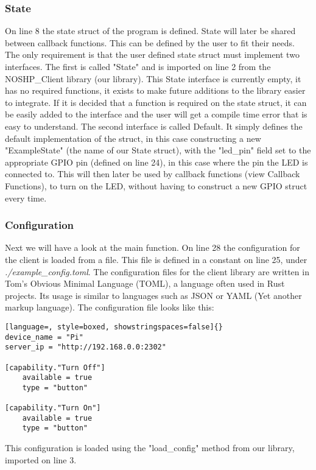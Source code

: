 \subsubsection{State}
On line 8 the state struct of the program is defined. State will later be shared between callback functions. This can be defined by the user to fit their needs. The only requirement is that the user defined state struct must implement two interfaces. The first is called "State" and is imported on line 2 from the NOSHP\_Client library (our library). This State interface is currently empty, it has no required functions, it exists to make future additions to the library easier to integrate. If it is decided that a function is required on the state struct, it can be easily added to the interface and the user will get a compile time error that is easy to understand. The second interface is called Default. It simply defines the default implementation of the struct, in this case constructing a new "ExampleState" (the name of our State struct), with the "led\_pin" field set to the appropriate GPIO pin (defined on line 24), in this case where the pin the LED is connected to. This will then later be used by callback functions (view Callback Functions), to turn on the LED, without having to construct a new GPIO struct every time.

\subsubsection{Configuration}
Next we will have a look at the main function. On line 28 the configuration for the client is loaded from a file. This file is defined in a constant on line 25, under \textit{./example\_config.toml}. The configuration files for the client library are written in Tom's Obvious Minimal Language (TOML), a language often used in Rust projects. Its usage is similar to languages such as JSON or YAML (Yet another markup language). The configuration file looks like this:

\begin{lstlisting}[language=, style=boxed, showstringspaces=false]{}
device_name = "Pi"
server_ip = "http://192.168.0.0:2302"

[capability."Turn Off"]
    available = true
    type = "button"

[capability."Turn On"]
    available = true
    type = "button"
\end{lstlisting}
This configuration is loaded using the "load\_config" method from our library, imported on line 3. 
